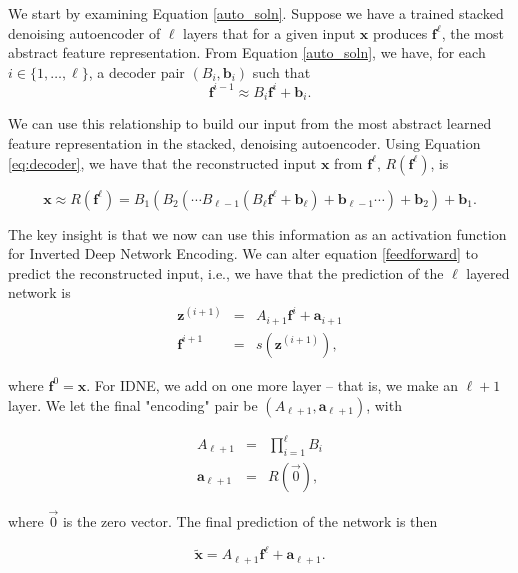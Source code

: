 We start by examining Equation \eqref{auto_soln}. Suppose we have a trained stacked denoising autoencoder  of $\ell$ layers that for a given input $\mathbf{x}$ produces $\mathbf{f}^\ell$, the most abstract feature representation. From Equation \eqref{auto_soln}, we have, for each $i\in\{1,\ldots,\ell\}$, a decoder pair $(B_i, \mathbf{b}_i)$ such that 
\begin{equation}
\label{eq:decoder}
\mathbf{f}^{i-1} \approx B_i \mathbf{f}^{i} + \mathbf{b}_i.
\end{equation}

We can use this relationship to build our input from the most abstract learned feature representation in the stacked, denoising autoencoder. Using Equation \eqref{eq:decoder}, we have that the reconstructed input $\mathbf{x}$ from $\mathbf{f}^\ell$, $R(\mathbf{f}^\ell)$, is

\begin{equation}
\mathbf{x}\approx R( \mathbf{f}^{\ell})  = B_1 (B_2 (\cdots B_{\ell-1}(B_\ell \mathbf{f}^{\ell} + \mathbf{b}_\ell) + \mathbf{b}_{\ell - 1} \cdots ) + \mathbf{b}_2) + \mathbf{b}_1.
\end{equation} 

The key insight is that we now can use this information as an activation function for Inverted Deep Network Encoding. We can alter equation \eqref{feedforward} to predict the reconstructed input, i.e., we have that the prediction of the $\ell$ layered network is 
\begin{eqnarray}
\label{fd1}
\mathbf{z}^{(i+1)} &=& A_{i+1} \mathbf{f}^{i} + \mathbf{a}_{i+1}\\
\mathbf{f}^{i+1} &=& s(\mathbf{z}^{(i+1)}),
\end{eqnarray}

where $\mathbf{f}^0 = \mathbf{x}$. For IDNE, we add on one more layer -- that is, we make an $\ell + 1$ layer. We let the final "encoding" pair be $(A_{\ell+1}, \mathbf{a}_{\ell+1})$, with

\begin{eqnarray}
A_{\ell+1} &=& \prod_{i=1}^{\ell} B_i \\ 
\mathbf{a}_{\ell+1} &=& R(\overrightarrow{0}),
\end{eqnarray}

where $\overrightarrow{0}$ is the zero vector. The final prediction of the network is then

\begin{equation}
\label{fd2}
\tilde{\mathbf{x}} = A_{\ell +1}\mathbf{f}^\ell + \mathbf{a}_{\ell+1}.
\end{equation}

